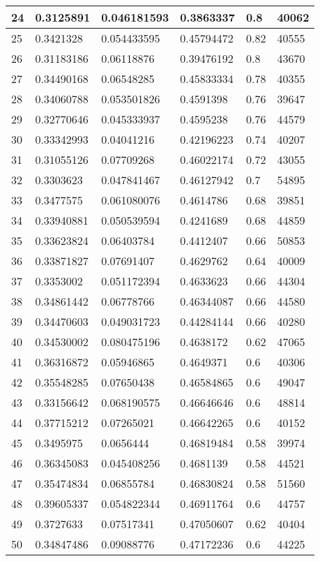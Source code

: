 \begin{longtable}{|l|l|l|l|l|l|}
24 & 0.3125891 & 0.046181593 & 0.3863337 & 0.8 & 40062 \\ \hline 
25 & 0.3421328 & 0.054433595 & 0.45794472 & 0.82 & 40555 \\ \hline 
26 & 0.31183186 & 0.06118876 & 0.39476192 & 0.8 & 43670 \\ \hline 
27 & 0.34490168 & 0.06548285 & 0.45833334 & 0.78 & 40355 \\ \hline 
28 & 0.34060788 & 0.053501826 & 0.4591398 & 0.76 & 39647 \\ \hline 
29 & 0.32770646 & 0.045333937 & 0.4595238 & 0.76 & 44579 \\ \hline 
30 & 0.33342993 & 0.04041216 & 0.42196223 & 0.74 & 40207 \\ \hline 
31 & 0.31055126 & 0.07709268 & 0.46022174 & 0.72 & 43055 \\ \hline 
32 & 0.3303623 & 0.047841467 & 0.46127942 & 0.7 & 54895 \\ \hline 
33 & 0.3477575 & 0.061080076 & 0.4614786 & 0.68 & 39851 \\ \hline 
34 & 0.33940881 & 0.050539594 & 0.4241689 & 0.68 & 44859 \\ \hline 
35 & 0.33623824 & 0.06403784 & 0.4412407 & 0.66 & 50853 \\ \hline 
36 & 0.33871827 & 0.07691407 & 0.4629762 & 0.64 & 40009 \\ \hline 
37 & 0.3353002 & 0.051172394 & 0.4633623 & 0.66 & 44304 \\ \hline 
38 & 0.34861442 & 0.06778766 & 0.46344087 & 0.66 & 44580 \\ \hline 
39 & 0.34470603 & 0.049031723 & 0.44284144 & 0.66 & 40280 \\ \hline 
40 & 0.34530002 & 0.080475196 & 0.4638172 & 0.62 & 47065 \\ \hline 
41 & 0.36316872 & 0.05946865 & 0.4649371 & 0.6 & 40306 \\ \hline 
42 & 0.35548285 & 0.07650438 & 0.46584865 & 0.6 & 49047 \\ \hline 
43 & 0.33156642 & 0.068190575 & 0.46646646 & 0.6 & 48814 \\ \hline 
44 & 0.37715212 & 0.07265021 & 0.46642265 & 0.6 & 40152 \\ \hline 
45 & 0.3495975 & 0.0656444 & 0.46819484 & 0.58 & 39974 \\ \hline 
46 & 0.36345083 & 0.045408256 & 0.4681139 & 0.58 & 44521 \\ \hline 
47 & 0.35474834 & 0.06855784 & 0.46830824 & 0.58 & 51560 \\ \hline 
48 & 0.39605337 & 0.054822344 & 0.46911764 & 0.6 & 44757 \\ \hline 
49 & 0.3727633 & 0.07517341 & 0.47050607 & 0.62 & 40404 \\ \hline 
50 & 0.34847486 & 0.09088776 & 0.47172236 & 0.6 & 44225 \\ \hline 
\end{longtable}
